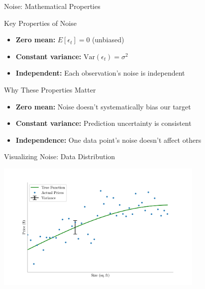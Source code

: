 \documentclass[10pt]{beamer}
\newcommand{\fitpic}[1]{\begin{adjustbox}{max width=\linewidth, max totalheight=0.78\textheight}#1\end{adjustbox}}
\begin{document}
\begin{frame}{Noise: Mathematical Properties}
\small
\begin{definitionbox}{Key Properties of Noise}
\raggedright
\begin{itemize}
\item \textbf{Zero mean:} $E[\epsilon_t] = 0$ (unbiased)
\item \textbf{Constant variance:} $\text{Var}(\epsilon_t) = \sigma^2$
\item \textbf{Independent:} Each observation's noise is independent
\end{itemize}
\end{definitionbox}

\begin{keypointsbox}{Why These Properties Matter}
\raggedright
\begin{itemize}
\item \textbf{Zero mean:} Noise doesn't systematically bias our target
\item \textbf{Constant variance:} Prediction uncertainty is consistent
\item \textbf{Independence:} One data point's noise doesn't affect others
\end{itemize}
\end{keypointsbox}
\end{frame}


\begin{frame}{Visualizing Noise: Data Distribution}
\footnotesize
\begin{center}
\fitpic{\includegraphics[width=0.75\textwidth]{../assets/bias-variance/figures/data_var_latexify.pdf}}
\end{center}
\end{frame}
\end{document}
